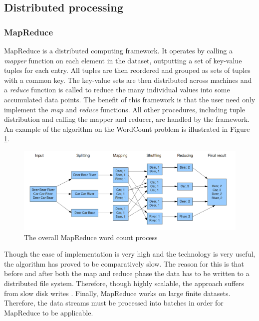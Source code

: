 \subsection{Distributed processing}
\subsubsection{MapReduce}
MapReduce \cite{mapreduce} is a distributed computing framework. It operates by calling a \emph{mapper} function on each element in the dataset, outputting a set of key-value tuples for each entry. All tuples are then reordered and grouped as sets of tuples with a common key. The key-value sets are then distributed across machines and a \emph{reduce} function is called to reduce the many individual values into some accumulated data points. The benefit of this framework is that the user need only implement the \emph{map} and \emph{reduce} functions. All other procedures, including tuple distribution and calling the mapper and reducer, are handled by the framework. An example of the algorithm on the WordCount problem is illustrated in Figure \ref{img:mapreduce}.

\begin{figure}
\centering
\includegraphics[width=\textwidth]{resources/img/mapreduce.png}
\caption{The overall MapReduce word count process \cite{mapreduce_img}}
\label{img:mapreduce}
\end{figure}

Though the ease of implementation is very high and the technology is very useful, the algorithm has proved to be comparatively slow. The reason for this is that before and after both the map and reduce phase the data has to be written to a distributed file system. Therefore, though highly scalable, the approach suffers from slow disk writes \cite{mapreduce_vs_spark}. Finally, MapReduce works on large finite datasets. Therefore, the data streams must be processed into batches in order for MapReduce to be applicable.

